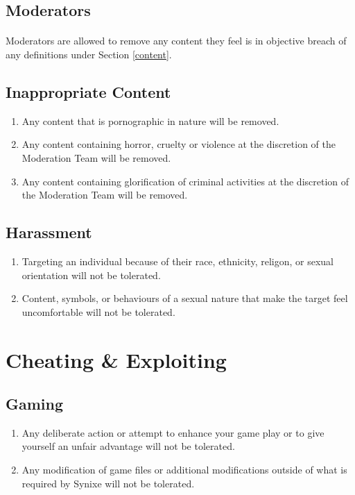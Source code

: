 \documentclass[10pt,a4paper]{article}
\begin{document}
\subsection{Moderators}
\paragraph{}
Moderators are allowed to remove any content they feel is in objective breach of any definitions under Section \ref{content}.
\subsection{Inappropriate Content}
\begin{enumerate}
	\item Any content that is pornographic in nature will be removed.
	\item Any content containing horror, cruelty or violence at the discretion of the Moderation Team will be removed.
	\item Any content containing glorification of criminal activities at the discretion of the Moderation Team will be removed.
\end{enumerate}
\subsection{Harassment}
\begin{enumerate}
	\item Targeting an individual because of their race, ethnicity, religon, or sexual orientation will not be tolerated.
	\item Content, symbols, or behaviours of a sexual nature that make the target feel uncomfortable will not be tolerated.
	
\end{enumerate}
\section{Cheating \& Exploiting} \label{cheating}
\subsection{Gaming}
\begin{enumerate}
	\item Any deliberate action or attempt to enhance your game play or to give yourself an unfair advantage will not be tolerated.
	\item Any modification of game files or additional modifications outside of what is required by Synixe will not be tolerated.
\end{enumerate}
\end{document}
